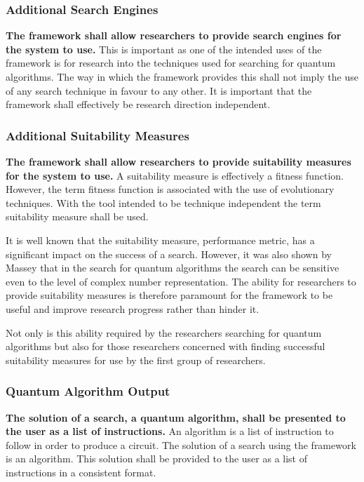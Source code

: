 \subsubsection{Additional Search Engines}
\textbf{The framework shall allow researchers to provide search engines for the system to use.}
This is important as one of the intended uses of the framework is for research into the techniques used for searching for quantum algorithms.
The way in which the framework provides this shall not imply the use of any search technique in favour to any other.
It is important that the framework shall effectively be research direction independent.

\subsubsection{Additional Suitability Measures}
\textbf{The framework shall allow researchers to provide suitability measures for the system to use.}
A suitability measure is effectively a fitness function.
However, the term fitness function is associated with the use of evolutionary techniques.
With the tool intended to be technique independent the term suitability measure shall be used.

It is well known that the suitability measure, performance metric, has a significant impact on the success of a search.
However, it was also shown by Massey\cite{masseythesis} that in the search for quantum algorithms the search can be sensitive even to the level of complex number representation.
The ability for researchers to provide suitability measures is therefore paramount for the framework to be useful and improve research progress rather than hinder it.

Not only is this ability required by the researchers searching for quantum algorithms but also for those researchers concerned with finding successful suitability measures for use by the first group of researchers.

\subsubsection{Quantum Algorithm Output}
\textbf{The solution of a search, a quantum algorithm, shall be presented to the user as a list of instructions.}
An algorithm is a list of instruction to follow in order to produce a circuit.
The solution of a search using the framework is an algorithm.
This solution shall be provided to the user as a list of instructions in a consistent format.

